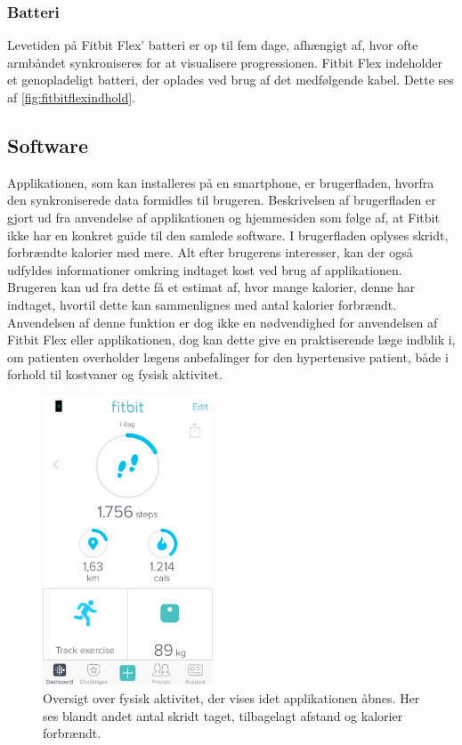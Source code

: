 \subsubsection{Batteri} 
Levetiden på Fitbit Flex' batteri er op til fem dage, afhængigt af, hvor ofte armbåndet synkroniseres for at visualisere progressionen.
Fitbit Flex indeholder et genopladeligt batteri, der oplades ved brug af det medfølgende kabel. Dette ses af \autoref{fig:fitbitflexindhold}. 

\subsection{Software}
Applikationen, som kan installeres på en smartphone, er brugerfladen, hvorfra den synkroniserede data formidles til brugeren. Beskrivelsen af brugerfladen er gjort ud fra anvendelse af applikationen og hjemmesiden som følge af, at Fitbit ikke har en konkret guide til den samlede software. I brugerfladen oplyses skridt, forbrændte kalorier med mere. 
Alt efter brugerens interesser, kan der også udfyldes informationer omkring indtaget kost ved brug af applikationen. Brugeren kan ud fra dette få et estimat af, hvor mange kalorier, denne har indtaget, hvortil dette kan sammenlignes med antal kalorier forbrændt. Anvendelsen af denne funktion er dog ikke en nødvendighed for anvendelsen af Fitbit Flex eller applikationen, dog kan dette give en praktiserende læge indblik i, om patienten overholder lægens anbefalinger for den hypertensive patient, både i forhold til kostvaner og fysisk aktivitet.

\begin{figure}[H]
	\centering
	\includegraphics[width=0.45\textwidth]{figures/burgerfladeoversigt}
	\caption{Oversigt over fysisk aktivitet, der vises idet applikationen åbnes. Her ses blandt andet antal skridt taget, tilbagelagt afstand og kalorier forbrændt.}
	\label{fig:brugerfladeoversigt}
\end{figure}

